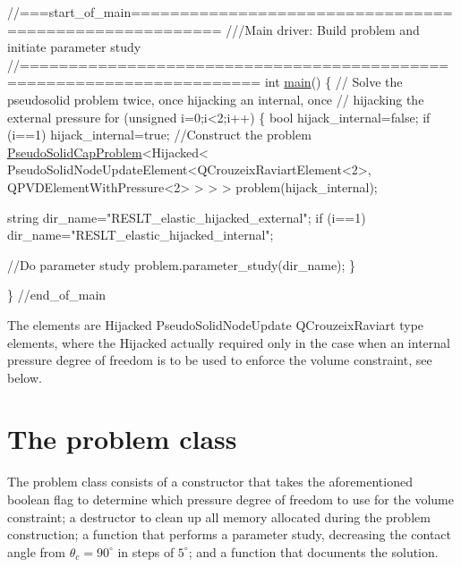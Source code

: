 \begin{DoxyCodeInclude}
\textcolor{comment}{//===start\_of\_main=======================================================}
\textcolor{comment}{///Main driver: Build problem and initiate parameter study}
\textcolor{comment}{}\textcolor{comment}{//======================================================================}
\textcolor{keywordtype}{int} \hyperlink{static__single__layer_8cc_ae66f6b31b5ad750f1fe042a706a4e3d4}{main}()
\{
  \textcolor{comment}{// Solve the pseudosolid problem twice, once hijacking an internal, once}
 \textcolor{comment}{// hijacking the external pressure}
 \textcolor{keywordflow}{for} (\textcolor{keywordtype}{unsigned} i=0;i<2;i++)
  \{
   \textcolor{keywordtype}{bool} hijack\_internal=\textcolor{keyword}{false};
   \textcolor{keywordflow}{if} (i==1) hijack\_internal=\textcolor{keyword}{true};
   \textcolor{comment}{//Construct the problem}
   \hyperlink{classPseudoSolidCapProblem}{PseudoSolidCapProblem}<Hijacked<
     PseudoSolidNodeUpdateElement<QCrouzeixRaviartElement<2>,
    QPVDElementWithPressure<2> > > >  problem(hijack\_internal);

   \textcolor{keywordtype}{string} dir\_name=\textcolor{stringliteral}{"RESLT\_elastic\_hijacked\_external"};
   \textcolor{keywordflow}{if} (i==1) dir\_name=\textcolor{stringliteral}{"RESLT\_elastic\_hijacked\_internal"};

   \textcolor{comment}{//Do parameter study}
   problem.parameter\_study(dir\_name);
  \}

\} \textcolor{comment}{//end\_of\_main}

\end{DoxyCodeInclude}


The elements are {\ttfamily Hijacked} {\ttfamily Pseudo\+Solid\+Node\+Update} {\ttfamily Q\+Crouzeix\+Raviart} type elements, where the {\ttfamily Hijacked} actually required only in the case when an internal pressure degree of freedom is to be used to enforce the volume constraint, see below.\hypertarget{index_problem}{}\section{The problem class}\label{index_problem}
The problem class consists of a constructor that takes the aforementioned boolean flag to determine which pressure degree of freedom to use for the volume constraint; a destructor to clean up all memory allocated during the problem construction; a function that performs a parameter study, decreasing the contact angle from $ \theta_{c} = 90^{\circ} $ in steps of $ 5^{\circ} $; and a function that documents the solution.

